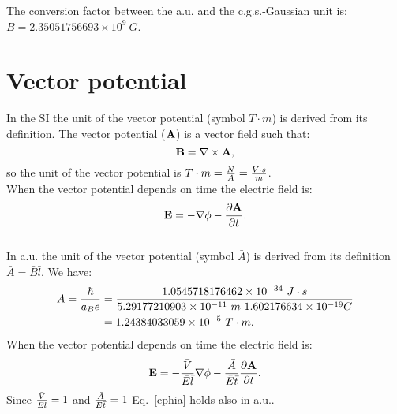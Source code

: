 \documentclass[12pt,a4paper]{article}
\def\hbarf{1.0545718176462\times 10^{-34}}
\def\e{1.602176634\times 10^{-19}}
\def\abohr{5.29177210903\times 10^{-11}}
\def\barav{1.24384033059\times 10^{-5}}
\def\toverg{9.99999999726\times 10^{3}}
\def\barbcgs{2.35051756693\times 10^{9}}
\begin{document}

{\color{green} 
The conversion factor between the a.u. and the c.g.s.-Gaussian unit is: 
$\bar B = \barbcgs\ G$.
}

\newpage
\section{\color{coral}Vector potential}

In the SI the unit of the vector potential (symbol $T \cdot m$)
is derived from its definition. The vector potential (${\bf A}$)
is a vector field such that:
\begin{equation}
{\bf B}=\nabla \times {\bf A},
\label{defav}
\end{equation}
so the unit of the vector potential is $T\cdot m={N \over A}=
{V\cdot s \over m}$. \\
When the vector potential depends on time the electric field is:
\begin{equation}
{\bf E}=-\nabla \phi -{\partial {\bf A} \over \partial t}.
\label{ephia}
\end{equation}
\\

{\color{web-blue} In a.u. the unit of the vector potential
(symbol $\bar A$) is derived from its definition $\bar A = \bar B \bar l$.
We have:
\begin{align}
\bar A = {\hbar \over a_B e}&= {\hbarf\ J\cdot s \over \abohr\ m\ \e C}
\nonumber \\ 
&= \barav\ T\cdot m.
\end{align}
When the vector potential depends on time the electric field is:
\begin{equation}
{\bf E}=-{\bar V \over \bar E \bar l} \nabla \phi -
{\bar A \over \bar E \bar t} {\partial {\bf A} \over \partial t}.
\label{ephiagen}
\end{equation}
Since ${\bar V \over \bar E \bar l}=1$ and 
${\bar A \over \bar E \bar t}=1$ Eq.~\ref{ephia} holds also in a.u..
}
\\
\end{document}
